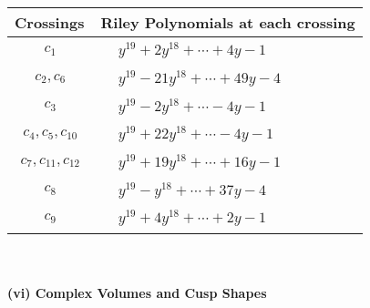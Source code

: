 \documentclass[1p]{elsarticle_modified}
\theoremstyle{definition}
\begin{document}
\begin{tabular}{m{50pt}|m{274pt}}
Crossings & \hspace{64pt}Riley Polynomials at each crossing \\
\hline $$\begin{aligned}c_{1}\end{aligned}$$&$\begin{aligned}
&y^{19}+2 y^{18}+\cdots+4 y-1
\end{aligned}$\\
\hline $$\begin{aligned}c_{2},c_{6}\end{aligned}$$&$\begin{aligned}
&y^{19}-21 y^{18}+\cdots+49 y-4
\end{aligned}$\\
\hline $$\begin{aligned}c_{3}\end{aligned}$$&$\begin{aligned}
&y^{19}-2 y^{18}+\cdots-4 y-1
\end{aligned}$\\
\hline $$\begin{aligned}c_{4},c_{5},c_{10}\end{aligned}$$&$\begin{aligned}
&y^{19}+22 y^{18}+\cdots-4 y-1
\end{aligned}$\\
\hline $$\begin{aligned}c_{7},c_{11},c_{12}\end{aligned}$$&$\begin{aligned}
&y^{19}+19 y^{18}+\cdots+16 y-1
\end{aligned}$\\
\hline $$\begin{aligned}c_{8}\end{aligned}$$&$\begin{aligned}
&y^{19}- y^{18}+\cdots+37 y-4
\end{aligned}$\\
\hline $$\begin{aligned}c_{9}\end{aligned}$$&$\begin{aligned}
&y^{19}+4 y^{18}+\cdots+2 y-1
\end{aligned}$\\
\hline
\end{tabular}\\~\\
\newpage\flushleft \textbf{(vi) Complex Volumes and Cusp Shapes}
\end{document}
